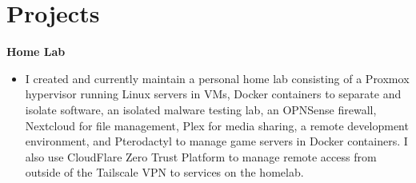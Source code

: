 \documentclass{article}
\newcommand{\topLevelProjectItem}[2]{
    \textbf{#1}\hfill \emph{#2}\newline
    \vspace{-18pt}\begin{itemize}
}
\newcommand{\topLevelItemEnd}{\end{itemize}\vspace{5pt}}
\newcommand{\lowLevelItem}[1]{
    \item\small{#1}\vspace{-8pt}
}
\begin{document}
\section*{Projects}
\topLevelProjectItem{Home Lab}{{}} %
\lowLevelItem{I created and currently maintain a personal home lab consisting of a Proxmox hypervisor running Linux servers in VMs, Docker containers to separate and isolate software, an isolated malware testing lab, an OPNSense firewall, Nextcloud for file management, Plex for media sharing, a remote development environment, and Pterodactyl to manage game servers in Docker containers.  I also use CloudFlare Zero Trust Platform to manage remote access from outside of the Tailscale VPN to services on the homelab.}
\topLevelItemEnd
\end{document}
